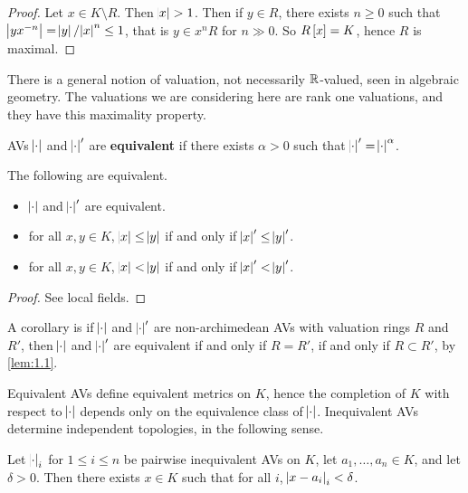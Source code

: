 \begin{proof}
Let $ x \in K \setminus R $. Then $ \abs{x} > 1 $. Then if $ y \in R $, there exists $ n \ge 0 $ such that $ \abs{yx^{-n}} = \abs{y} / \abs{x}^n \le 1 $, that is $ y \in x^nR $ for $ n \gg 0 $. So $ R\sbr{x} = K $, hence $ R $ is maximal.
\end{proof}

\begin{remark*}
There is a general notion of valuation, not necessarily $ \mathbb{R} $-valued, seen in algebraic geometry. The valuations we are considering here are rank one valuations, and they have this maximality property.
\end{remark*}

AVs $ \abs{\cdot} $ and $ \abs{\cdot}' $ are \textbf{equivalent} if there exists $ \alpha > 0 $ such that $ \abs{\cdot}' = \abs{\cdot}^\alpha $.

\begin{proposition}
\label{prop:1.2}
The following are equivalent.
\begin{itemize}
\item $ \abs{\cdot} $ and $ \abs{\cdot}' $ are equivalent.
\item for all $ x, y \in K $, $ \abs{x} \le \abs{y} $ if and only if $ \abs{x}' \le \abs{y}' $.
\item for all $ x, y \in K $, $ \abs{x} < \abs{y} $ if and only if $ \abs{x}' < \abs{y}' $.
\end{itemize}
\end{proposition}

\begin{proof}
See local fields.
\end{proof}

A corollary is if $ \abs{\cdot} $ and $ \abs{\cdot}' $ are non-archimedean AVs with valuation rings $ R $ and $ R' $, then $ \abs{\cdot} $ and $ \abs{\cdot}' $ are equivalent if and only if $ R = R' $, if and only if $ R \subset R' $, by \ref{lem:1.1}.

\pagebreak

Equivalent AVs define equivalent metrics on $ K $, hence the completion of $ K $ with respect to $ \abs{\cdot} $ depends only on the equivalence class of $ \abs{\cdot} $. Inequivalent AVs determine independent topologies, in the following sense.

\begin{proposition}
Let $ \abs{\cdot}_i $ for $ 1 \le i \le n $ be pairwise inequivalent AVs on $ K $, let $ a_1, \dots, a_n \in K $, and let $ \delta > 0 $. Then there exists $ x \in K $ such that for all $ i $, $ \abs{x - a_i}_i < \delta $.
\end{proposition}

